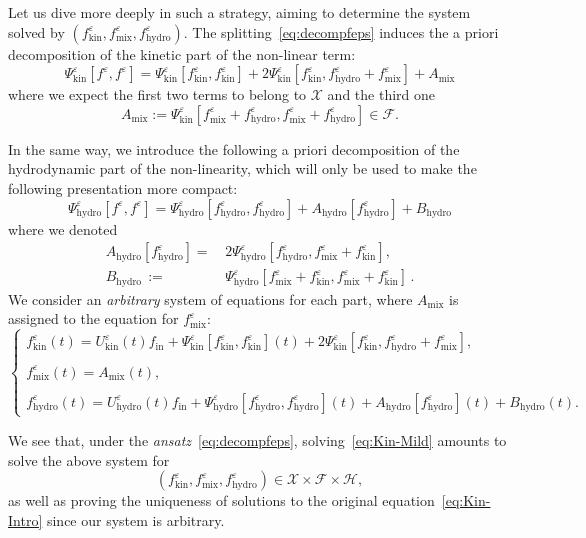 \documentclass[AHL,Unicode,longabstracts,published]{cedram}
\newcommand{\ini}{\mathrm{in}}
\newcommand{\hyd}{\mathrm{hydro}}
\newcommand{\mix}{\mathrm{mix}}
\newcommand{\kin}{\mathrm{kin}}
\newcommand{\FFF}{\mathscr{F}}
\newcommand{\HHH}{\mathscr{H}}
\newcommand{\GGG}{\mathscr{X}}
\newcommand{\SSSs}{\HHH}
\newcommand{\SSSl}{\GGG}
\newcommand{\SSSm}{\FFF}
\newcommand*\eps{{\varepsilon}}
\begin{document}
Let us dive more deeply in such a strategy, aiming to determine the system solved by $(f^\eps_\kin,f^\eps_\mix,f^\eps_\hyd)$. The splitting~\eqref{eq:decompfeps} induces the a priori decomposition of the kinetic part of the non-linear term:
\[
\Psi^\eps_\kin\left[f^\eps, f^\eps\right] = \Psi^\eps_\kin \left[f^\eps_\kin, f^\eps_\kin \right] + 2 \Psi^\eps_\kin \left[f^\eps_\kin, f^\eps_\hyd + f^\eps_\mix\right] + A_\mix
\]
where we expect the first two terms to belong to $\SSSl$ and the third one
\[
A_\mix:=\Psi^\eps_\kin \left[f^\eps_\mix + f^\eps_\hyd, f^\eps_\mix + f^\eps_\hyd \right] \in \SSSm.
\]


In the same way, we introduce the following a priori decomposition of the hydrodynamic part of the non-linearity, which will only be used to make the following presentation more compact:
\[
\Psi^\eps_\hyd\left[f^\eps, f^\eps\right]=\Psi^\eps_\hyd \left[f^\eps_\hyd, f^\eps_\hyd\right] + A_\hyd\left[f^\eps_\hyd\right] + B_\hyd
\]
where we denoted
\begin{align*}
A_\hyd\left[f^\eps_\hyd\right] =&\, 2 \Psi^\eps_\hyd\left[f^\eps_\hyd, f^\eps_\mix + f^\eps_\kin\right], \\
 B_\hyd\,{:=}&\, \Psi^\eps_\hyd \left[f^\eps_\mix + f^\eps_\kin, f^\eps_\mix + f^\eps_\kin \right]\,.
\end{align*}
We consider an \emph{arbitrary} system of equations for each part, where $A_\mix$ is assigned to the equation for $f^\eps_\mix$:
\begin{equation*}\label{eq:systemE}
\begin{cases}
f^\eps_\kin(t) = U^\eps_\kin(t) f_\ini + \Psi^\eps_\kin \left[f^\eps_\kin, f^\eps_\kin \right](t) + 2 \Psi^\eps_\kin \left[f^\eps_\kin, f^\eps_\hyd + f^\eps_\mix\right],\\
\\
f^\eps_\mix(t) = A_\mix(t),\\
\\
f^\eps_\hyd(t) = U^\eps_\hyd(t) f_\ini + \Psi^\eps_\hyd\left[f^\eps_\hyd, f^\eps_\hyd\right](t) + A_\hyd\left[f^\eps_\hyd\right](t) + B_\hyd(t).
\end{cases}
\end{equation*}

We see that, under the \emph{ansatz}~\eqref{eq:decompfeps}, solving~\eqref{eq:Kin-Mild} amounts to solve the above system for
\[
\left(f^\eps_\kin,f^\eps_\mix,f^\eps_\hyd\right) \in \SSSl\times \SSSm\times \SSSs,
\]
as well as proving the uniqueness of solutions to the original equation~\eqref{eq:Kin-Intro} since our system is arbitrary.
\end{document}
